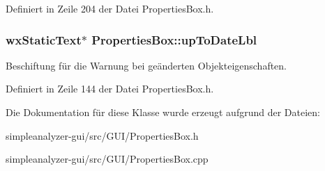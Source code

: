 Definiert in Zeile 204 der Datei Properties\-Box.\-h.

\hypertarget{classPropertiesBox_acd0a5ccaa4e981b961685c5714e67f92}{
\subsubsection[{up\-To\-Date\-Lbl}]{\setlength{\rightskip}{0pt plus 5cm}wx\-Static\-Text$\ast$ Properties\-Box\-::up\-To\-Date\-Lbl\hspace{0.3cm}{\ttfamily [private]}}}\label{classPropertiesBox_acd0a5ccaa4e981b961685c5714e67f92}
Beschiftung für die Warnung bei geänderten Objekteigenschaften. 

Definiert in Zeile 144 der Datei Properties\-Box.\-h.



Die Dokumentation für diese Klasse wurde erzeugt aufgrund der Dateien\-:\begin{DoxyCompactItemize}
\item 
simpleanalyzer-\/gui/src/\-G\-U\-I/Properties\-Box.\-h\item 
simpleanalyzer-\/gui/src/\-G\-U\-I/Properties\-Box.\-cpp\end{DoxyCompactItemize}
